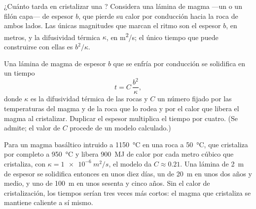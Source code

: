 ¿Cuánto tarda en cristalizar una ? Considera una lámina de
magma ---un  o un filón capa--- de espesor $b$, que pierde su calor por
conducción hacia la roca de ambos lados. Las únicas magnitudes que marcan el
ritmo son el espesor $b$, en metros, y la difusividad térmica $\kappa$, en
\unit{m^2/s}; el único tiempo que puede construirse con ellas es $b^2/\kappa$.

\begin{proposition}\label{prop:g11:igneous-rocks:cooling}
Una lámina de magma de espesor $b$ que se enfría por conducción se solidifica
en un tiempo
\[
  t = C\,\frac{b^2}{\kappa},
\]
donde $\kappa$ es la difusividad térmica de las rocas y $C$ un número fijado
por las temperaturas del magma y de la roca que lo rodea y por el calor que
libera el magma al cristalizar. Duplicar el espesor multiplica el tiempo por
cuatro. (Se admite; el valor de $C$ procede de un modelo calculado.)
\end{proposition}

Para un magma basáltico intruido a \qty{1150}{\degreeCelsius} en una roca a
\qty{50}{\degreeCelsius}, que cristaliza por completo a
\qty{950}{\degreeCelsius} y libera \qty{900}{MJ} de calor por cada metro
cúbico que cristaliza, con $\kappa = \qty{1e-6}{m^2/s}$, el modelo da
$C \approx 0.21$. Una lámina de \qty{2}{m} de espesor se solidifica entonces
en unos diez días, un  de \qty{20}{m} en unos dos años y medio, y
uno de \qty{100}{m} en unos sesenta y cinco años. Sin el calor de
cristalización, los tiempos serían tres veces más cortos: el magma que
cristaliza se mantiene caliente a sí mismo.

